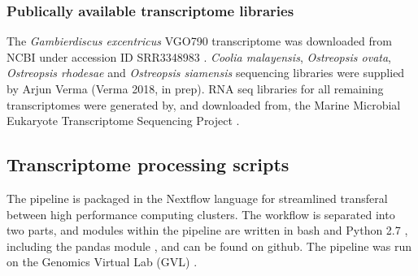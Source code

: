 \documentclass[12pt]{article}
\begin{document}
\subsubsection*{Publically available transcriptome libraries}
The \emph{Gambierdiscus excentricus} VGO790 transcriptome was downloaded from NCBI under accession ID SRR3348983 \cite{kohli2017role}. 
\textit{Coolia malayensis}, \textit{Ostreopsis ovata}, \textit{Ostreopsis rhodesae} and \textit{Ostreopsis siamensis} sequencing libraries were supplied by Arjun Verma (Verma 2018, in prep). 
RNA seq libraries for all remaining transcriptomes were generated by, and downloaded from, the Marine Microbial Eukaryote Transcriptome Sequencing Project \citep{keeling2014marine}.

\subsection*{Transcriptome processing scripts}
The pipeline is packaged in the Nextflow language \cite{nextflow} for streamlined transferal between high performance computing clusters. 
The workflow is separated into two parts, and modules within the pipeline are written in bash and Python 2.7 \cite{python}, including the pandas module \cite{pandas}, and can be found on github. 
The pipeline was run on the Genomics Virtual Lab (GVL) \cite{afgan2015genomics}.
\end{document}
